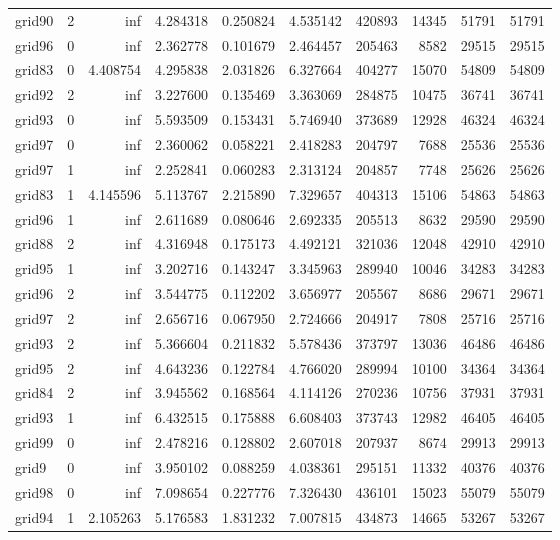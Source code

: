 \begin{longtable}{|l|r|r|r|r|r|r|r|r|r|}
grid90 & 2 & inf & 4.284318 & 0.250824 & 4.535142 & 420893 & 14345 & 51791 & 51791 \\
grid96 & 0 & inf & 2.362778 & 0.101679 & 2.464457 & 205463 & 8582 & 29515 & 29515 \\
grid83 & 0 & 4.408754 & 4.295838 & 2.031826 & 6.327664 & 404277 & 15070 & 54809 & 54809 \\
grid92 & 2 & inf & 3.227600 & 0.135469 & 3.363069 & 284875 & 10475 & 36741 & 36741 \\
grid93 & 0 & inf & 5.593509 & 0.153431 & 5.746940 & 373689 & 12928 & 46324 & 46324 \\
grid97 & 0 & inf & 2.360062 & 0.058221 & 2.418283 & 204797 & 7688 & 25536 & 25536 \\
grid97 & 1 & inf & 2.252841 & 0.060283 & 2.313124 & 204857 & 7748 & 25626 & 25626 \\
grid83 & 1 & 4.145596 & 5.113767 & 2.215890 & 7.329657 & 404313 & 15106 & 54863 & 54863 \\
grid96 & 1 & inf & 2.611689 & 0.080646 & 2.692335 & 205513 & 8632 & 29590 & 29590 \\
grid88 & 2 & inf & 4.316948 & 0.175173 & 4.492121 & 321036 & 12048 & 42910 & 42910 \\
grid95 & 1 & inf & 3.202716 & 0.143247 & 3.345963 & 289940 & 10046 & 34283 & 34283 \\
grid96 & 2 & inf & 3.544775 & 0.112202 & 3.656977 & 205567 & 8686 & 29671 & 29671 \\
grid97 & 2 & inf & 2.656716 & 0.067950 & 2.724666 & 204917 & 7808 & 25716 & 25716 \\
grid93 & 2 & inf & 5.366604 & 0.211832 & 5.578436 & 373797 & 13036 & 46486 & 46486 \\
grid95 & 2 & inf & 4.643236 & 0.122784 & 4.766020 & 289994 & 10100 & 34364 & 34364 \\
grid84 & 2 & inf & 3.945562 & 0.168564 & 4.114126 & 270236 & 10756 & 37931 & 37931 \\
grid93 & 1 & inf & 6.432515 & 0.175888 & 6.608403 & 373743 & 12982 & 46405 & 46405 \\
grid99 & 0 & inf & 2.478216 & 0.128802 & 2.607018 & 207937 & 8674 & 29913 & 29913 \\
grid9 & 0 & inf & 3.950102 & 0.088259 & 4.038361 & 295151 & 11332 & 40376 & 40376 \\
grid98 & 0 & inf & 7.098654 & 0.227776 & 7.326430 & 436101 & 15023 & 55079 & 55079 \\
grid94 & 1 & 2.105263 & 5.176583 & 1.831232 & 7.007815 & 434873 & 14665 & 53267 & 53267 \\

\end{longtable}
